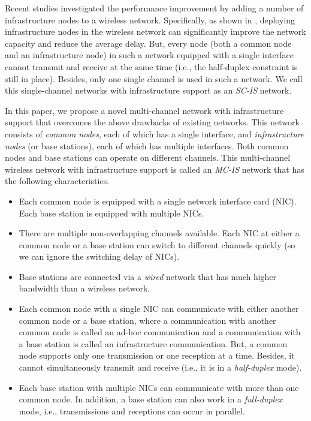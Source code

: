 \documentclass[10pt,journal]{IEEEtran}
\begin{document}
Recent studies \cite{bliu:infocom2003,Kozat:mobicom2003,Zemlianov:jsac05,bliu:mobihoc2007,panli:jsac09,XWang:TC2010} investigated the performance improvement by adding a number of infrastructure nodes to a wireless network. Specifically, as shown in \cite{bliu:infocom2003,panli:jsac09}, deploying infrastructure nodes in the wireless network can significantly improve the network capacity and reduce the average delay. But, every node (both a common node and an infrastructure node) in such a network equipped with a single interface cannot transmit and receive at the same time (i.e., the half-duplex constraint is still in place). Besides, only one single channel is used in such a network. We call this single-channel networks with infrastructure support as an \textit{SC-IS} network. 


In this paper, we propose a novel multi-channel network with infrastructure support that overcomes the above drawbacks of existing networks. This network consists of \textit{common nodes}, each of which has a single interface, and \textit{infrastructure nodes} (or base stations), each of which has multiple interfaces. Both common nodes and base stations can operate on different channels. This multi-channel wireless network with infrastructure support is called an \textit{MC-IS} network that has the following characteristics.
\begin{itemize}
	\item Each common node is equipped with a single network interface card (NIC). Each base station is equipped with multiple NICs.
	\item There are multiple non-overlapping channels available. Each NIC at either a common node or a base station can switch to different channels quickly (so we can ignore the switching delay of NICs). 
	\item Base stations are connected via a \textit{wired} network that has much higher bandwidth than a wireless network.
	\item Each common node with a single NIC can communicate with either another common node or a base station, where a communication with another common node is called an ad-hoc communication and a communication with a base station is called an infrastructure communication. But, a common node supports only one transmission or one reception at a time. Besides, it cannot simultaneously transmit and receive (i.e., it is in a \textit{half-duplex} mode). 
	\item Each base station with multiple NICs can communicate with more than one common node. In addition, a base station can also work in a \textit{full-duplex} mode, i.e., transmissions and receptions can occur in parallel. 
\end{itemize}
\end{document}

